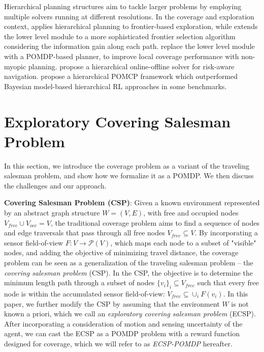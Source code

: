 \documentclass{article}
\newcommand{\ph}[1]{{\textbf{#1}:}} %
\begin{document}
Hierarchical planning structures \cite{kaelbling2011planning} aim to tackle larger problems by employing multiple solvers running at different resolutions.  
%
In the coverage and exploration context, \citet{umari2017autonomous} applies hierarchical planning to frontier-based exploration, while  \cite{dang2019explore} extends the lower level module to a more sophisticated frontier selection algorithm considering the information gain along each path. \citet{Lauri2016planning} replace the lower level module with a POMDP-based planner, to improve local coverage performance with non-myopic planning. \citet{kim2019bi} propose a hierarchical online-offline solver for risk-aware navigation. \citet{vien2015hierarchical} propose a hierarchical POMCP framework which outperformed Bayesian model-based hierarchical RL approaches in some benchmarks.

\section{Exploratory Covering Salesman Problem}
\label{sec:ECSPasPOMDP}
In this section, we introduce the coverage problem as a variant of the traveling salesman problem, and show how we formalize it as a POMDP. We then discuss the challenges and our approach. %

\ph{Covering Salesman Problem (CSP)} Given a known environment represented by an abstract graph structure $W = (V, E)$, with free and occupied nodes $V_{free}\cup V_{occ} = V$, the traditional coverage problem aims to find a sequence of nodes and edge traversals that pass through all free nodes $V_{free} \subseteq V$.  By incorporating a sensor field-of-view $F:V\rightarrow \mathcal{P}(V)$, which maps each node to a subset of "visible" nodes, and adding the objective of minimizing travel distance, the coverage problem can be seen as a generalization of the traveling salesman problem -- the \emph{covering salesman problem} (CSP).  In the CSP, the objective is to determine the minimum length path through a subset of nodes $\{v_i\}_i \subseteq V_{free}$ such that every free node is within the accumulated sensor field-of-view: $V_{free} \subseteq \cup_i F(v_i)$.
In this paper, we further modify the CSP by assuming that the environment $W$ is not known a priori, which we call an \emph{exploratory covering salesman problem} (ECSP).  After incorporating a consideration of motion and sensing uncertainty of the agent, we can cast the ECSP as a POMDP problem with a reward function designed for coverage, which we will refer to as \emph{ECSP-POMDP} hereafter.
\end{document}
